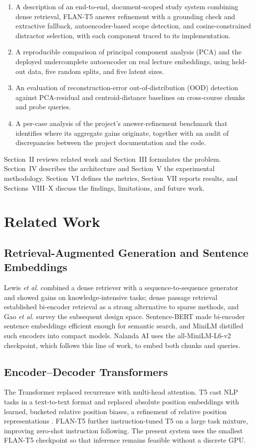 \documentclass[conference]{IEEEtran}
\begin{document}
\begin{enumerate}
\item A description of an end-to-end, document-scoped study system combining dense retrieval, FLAN-T5 answer refinement with a grounding check and extractive fallback, autoencoder-based scope detection, and cosine-constrained distractor selection, with each component traced to its implementation.
\item A reproducible comparison of principal component analysis (PCA) and the deployed undercomplete autoencoder on real lecture embeddings, using held-out data, five random splits, and five latent sizes.
\item An evaluation of reconstruction-error out-of-distribution (OOD) detection against PCA-residual and centroid-distance baselines on cross-course chunks and probe queries.
\item A per-case analysis of the project's answer-refinement benchmark that identifies where its aggregate gains originate, together with an audit of discrepancies between the project documentation and the code.
\end{enumerate}
Section~II reviews related work and Section~III formulates the problem. Section~IV describes the architecture and Section~V the experimental methodology. Section~VI defines the metrics, Section~VII reports results, and Sections~VIII--X discuss the findings, limitations, and future work.

\section{Related Work}
\subsection{Retrieval-Augmented Generation and Sentence Embeddings}
Lewis \emph{et al.} \cite{lewis2020} combined a dense retriever with a sequence-to-sequence generator and showed gains on knowledge-intensive tasks; dense passage retrieval \cite{karpukhin2020} established bi-encoder retrieval as a strong alternative to sparse methods, and Gao \emph{et al.} \cite{gao2023} survey the subsequent design space. Sentence-BERT \cite{reimers2019} made bi-encoder sentence embeddings efficient enough for semantic search, and MiniLM \cite{wang2020} distilled such encoders into compact models. Nalanda AI uses the all-MiniLM-L6-v2 checkpoint, which follows this line of work, to embed both chunks and queries.

\subsection{Encoder--Decoder Transformers}
The Transformer \cite{vaswani2017} replaced recurrence with multi-head attention. T5 \cite{raffel2020} cast NLP tasks in a text-to-text format and replaced absolute position embeddings with learned, bucketed relative position biases, a refinement of relative position representations \cite{shaw2018}. FLAN-T5 \cite{chung2024} further instruction-tuned T5 on a large task mixture, improving zero-shot instruction following. The present system uses the smallest FLAN-T5 checkpoint so that inference remains feasible without a discrete GPU.
\end{document}
